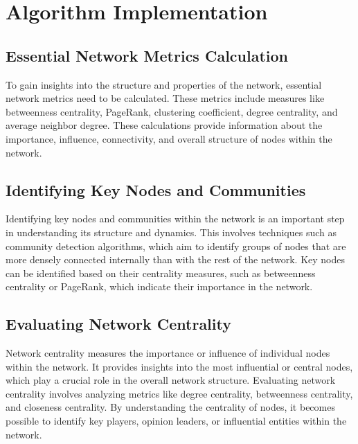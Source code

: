 \section{Algorithm Implementation}

\subsection{Essential Network Metrics Calculation}

To gain insights into the structure and properties of the network, essential network metrics need to be calculated. These metrics include measures like betweenness centrality, PageRank, clustering coefficient, degree centrality, and average neighbor degree. These calculations provide information about the importance, influence, connectivity, and overall structure of nodes within the network.

\subsection{Identifying Key Nodes and Communities}

Identifying key nodes and communities within the network is an important step in understanding its structure and dynamics. This involves techniques such as community detection algorithms, which aim to identify groups of nodes that are more densely connected internally than with the rest of the network. Key nodes can be identified based on their centrality measures, such as betweenness centrality or PageRank, which indicate their importance in the network.

\subsection{Evaluating Network Centrality}

Network centrality measures the importance or influence of individual nodes within the network. It provides insights into the most influential or central nodes, which play a crucial role in the overall network structure. Evaluating network centrality involves analyzing metrics like degree centrality, betweenness centrality, and closeness centrality. By understanding the centrality of nodes, it becomes possible to identify key players, opinion leaders, or influential entities within the network.
